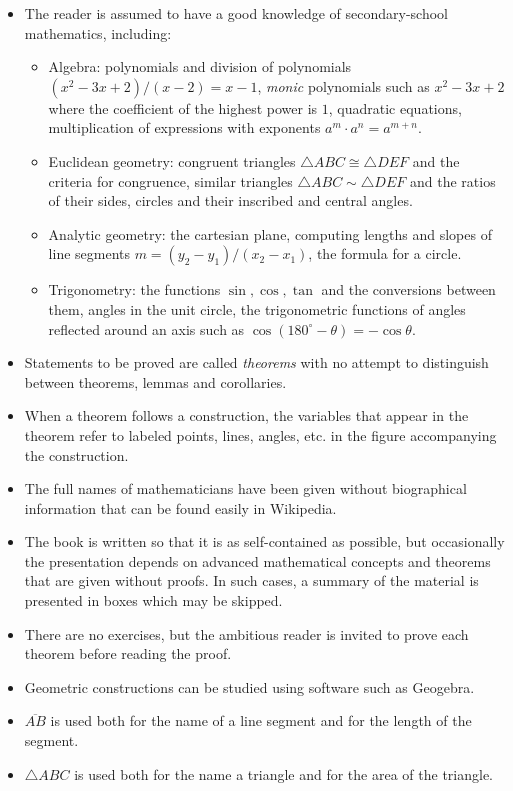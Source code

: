 \begin{itemize}
\item The reader is assumed to have a good knowledge of secondary-school mathematics, including:
\begin{itemize}
\item Algebra: polynomials and division of polynomials $(x^2-3x+2)/(x-2)=x-1$, \emph{monic} polynomials such as $x^2-3x+2$ where the coefficient of the highest power is $1$, quadratic equations, multiplication of expressions with exponents $a^m\cdot a^n=a^{m+n}$.
\item Euclidean geometry: congruent triangles $\triangle ABC \cong \triangle DEF$ and the criteria for congruence, similar triangles $\triangle ABC \sim \triangle DEF$ and the ratios of their sides, circles and their inscribed and central angles.
\item Analytic geometry: the cartesian plane, computing lengths and slopes of line segments $m=(y_2-y_1)/(x_2-x_1)$, the formula for a circle.
\item Trigonometry: the functions $\sin,\cos,\tan$ and the conversions between them, angles in the unit circle, the trigonometric functions of angles reflected around an axis such as $\cos (180^\circ-\theta)=-\cos\theta$.
\end{itemize}
\item Statements to be proved are called \emph{theorems} with no attempt to distinguish between theorems, lemmas and corollaries.
\item When a theorem follows a construction, the variables that appear in the theorem refer to labeled points, lines, angles, etc. in the figure accompanying the construction.
\item The full names of mathematicians have been given without biographical information that can be found easily in Wikipedia.
\item The book is written so that it is as self-contained as possible, but occasionally the presentation depends on advanced mathematical concepts and theorems that are given without proofs. In such cases, a summary of the material is presented in boxes which may be skipped.
\item There are no exercises, but the ambitious reader is invited to prove each theorem before reading the proof.
\item Geometric constructions can be studied using software such as Geogebra.
\item $\overline{AB}$ is used both for the name of a line segment and for the length of the segment.
\item $\triangle ABC$ is used both for the name a triangle and for the area of the triangle.
\end{itemize}


